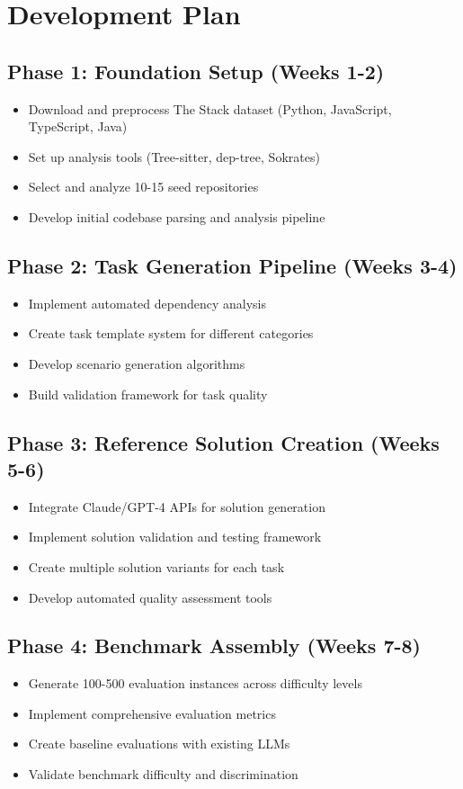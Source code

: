 \documentclass{article}
\begin{document}
\section{Development Plan}

\subsection{Phase 1: Foundation Setup (Weeks 1-2)}
\begin{itemize}
    \item Download and preprocess The Stack dataset (Python, JavaScript, TypeScript, Java)
    \item Set up analysis tools (Tree-sitter, dep-tree, Sokrates)
    \item Select and analyze 10-15 seed repositories
    \item Develop initial codebase parsing and analysis pipeline
\end{itemize}

\subsection{Phase 2: Task Generation Pipeline (Weeks 3-4)}
\begin{itemize}
    \item Implement automated dependency analysis
    \item Create task template system for different categories
    \item Develop scenario generation algorithms
    \item Build validation framework for task quality
\end{itemize}

\subsection{Phase 3: Reference Solution Creation (Weeks 5-6)}
\begin{itemize}
    \item Integrate Claude/GPT-4 APIs for solution generation
    \item Implement solution validation and testing framework
    \item Create multiple solution variants for each task
    \item Develop automated quality assessment tools
\end{itemize}

\subsection{Phase 4: Benchmark Assembly (Weeks 7-8)}
\begin{itemize}
    \item Generate 100-500 evaluation instances across difficulty levels
    \item Implement comprehensive evaluation metrics
    \item Create baseline evaluations with existing LLMs
    \item Validate benchmark difficulty and discrimination
\end{itemize}
\end{document}
